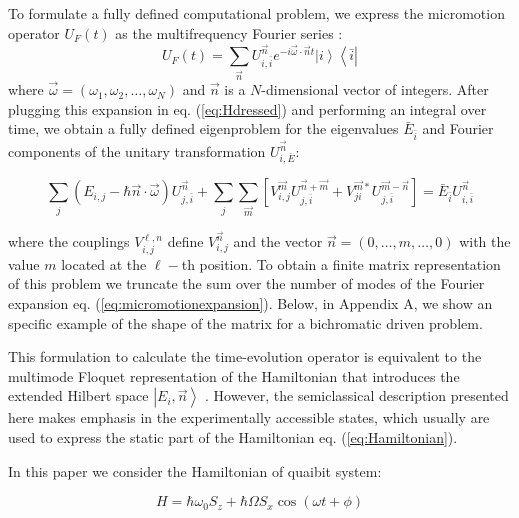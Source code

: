 \documentclass[pra,twocolumn,showkeys,preprintnumbers, amsmath,amssymb, aps,A4paper]{revtex4-1}
\begin{document}
To formulate a fully defined computational problem, we express the micromotion operator $U_F(t)$ as the multifrequency Fourier series \cite{ho1983semiclassical}:
\begin{equation}
U_F(t) = \sum_{\vec{n}} U_{i,\bar{i}}^{\vec{n}} e^{-i\vec{\omega} \cdot \vec{n}t} \left| i \right\rangle \left\langle \bar{i} \right|
\label{eq:micromotionexpansion}
\end{equation}
where $\vec{\omega} = (\omega_1,\omega_2,\ldots,\omega_N)$ and $\vec{n}$ is a $N$-dimensional vector of integers. After plugging this expansion in eq. (\ref{eq:Hdressed}) and performing an integral over time, we obtain a fully defined eigenproblem for the eigenvalues $\bar{E}_{\bar{i}}$ and Fourier components of the unitary transformation $U_{i,\bar{E}}^{\vec{n}}$:
\begin{widetext}
\begin{equation}
\sum_j(E_{i,j} - \hbar \vec{n} \cdot \vec{\omega})U^{\vec{n}}_{j,\bar{i}} + \sum_{j} \sum_{\vec{m}} \left[ V^{\vec{m}}_{i,j} U^{\vec{n}+\vec{m}}_{j,\bar{i}} + V^{\vec{m}*}_{ji} U^{\vec{m}-\vec{n}}_{j,\bar{i}}\right] = \bar{E}_{\bar{i}}U^{\vec{n}}_{i,\bar{i}}
\label{eq:multimodeeigenproblem}
\end{equation}
\end{widetext}
where the couplings $V_{i,j}^{\ell,n}$ define $V_{i,j}^{\vec{n}}$ and the vector $\vec{n} = (0,\ldots , m, \ldots, 0)$ with the value $m$ located at the $\ell-$th position. To obtain a finite matrix representation of this problem we truncate the sum over the number of modes of the Fourier expansion eq. (\ref{eq:micromotionexpansion}). Below, in Appendix A, we show an specific example of the shape of the matrix for a bichromatic driven problem. 

This formulation to calculate the time-evolution operator is equivalent to the multimode Floquet representation of the Hamiltonian that introduces the extended Hilbert space $\left| E_i,\vec{n} \right\rangle$  \cite{shirley1965solution,ho1983semiclassical,verdeny2016quasi}. However, the semiclassical description presented here makes emphasis in the experimentally accessible states, which usually are used to express the static part of the Hamiltonian eq.  (\ref{eq:Hamiltonian}). 

In this paper we consider the Hamiltonian of quaibit system:

\begin{equation}
H = \hbar \omega_0 S_z + \hbar \Omega S_x \cos (\omega t + \phi)
\end{equation}
\end{document}
